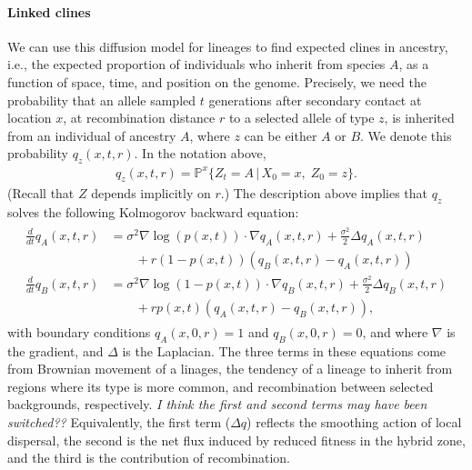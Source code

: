 \documentclass[11pt,letterpaper]{article}
\newcommand{\alisa}[1]{{\em \color{red} #1}}
\newcommand{\plr}[1]{{\em \color{blue} #1}}
\renewcommand{\P}{\mathbb{P}}
\newcommand{\grad}{\nabla}
\newcommand{\given}{\,\vert\,}
\begin{document}
\paragraph{Linked clines}
We can use this diffusion model for lineages to find expected clines in ancestry,
i.e., the expected proportion of individuals who inherit from species $A$,
as a function of space, time, and position on the genome.
Precisely, we need the probability that 
an allele sampled $t$ generations after secondary contact at location $x$,
at recombination distance $r$ to a selected allele of type $z$,
is inherited from an individual of ancestry $A$,
where $z$ can be either $A$ or $B$.
We denote this probability $q_z(x,t,r)$.
In the notation above,
\begin{align}
    q_z(x,t,r) = \P^x \{Z_t = A \given X_0 = x, \; Z_0 = z\} .
\end{align}
(Recall that $Z$ depends implicitly on $r$.) 
The description above implies that $q_z$ solves the following Kolmogorov backward equation:
\begin{align}
    \begin{aligned}  \label{eqn:q_pde}
    \frac{d}{dt} q_A(x,t,r) 
            &= \sigma^2 \grad \log(p(x,t)) \cdot \grad q_A(x,t,r) 
                + \frac{\sigma^2}{2} \Delta q_A(x,t,r) 
            \\ &\qquad {} + 
                r (1-p(x,t))(q_B(x,t,r)-q_A(x,t,r))  \\
    \frac{d}{dt} q_B(x,t,r) &= \sigma^2 \grad \log(1-p(x,t)) \cdot \grad q_B(x,t,r) 
            + \frac{\sigma^2}{2} \Delta q_B(x,t,r)
            \\ &\qquad {} + 
            r p(x,t) (q_A(x,t,r)-q_B(x,t,r))  ,
    \end{aligned} 
\end{align}
with boundary conditions $q_A(x,0,r)=1$ and $q_B(x,0,r)=0$, 
and where $\grad$ is the gradient, and $\Delta$ is the Laplacian.
The three terms in these equations come from Brownian movement of a linages,
the tendency of a lineage to inherit from regions where its type is more common,
and recombination between selected backgrounds, respectively. \alisa{I think the first and second terms may have been switched??}
Equivalently,
the first term ($\Delta q$) reflects the smoothing action of local dispersal,
the second is the net flux induced by reduced fitness in the hybrid zone,
and the third is the contribution of recombination. 
\end{document}
